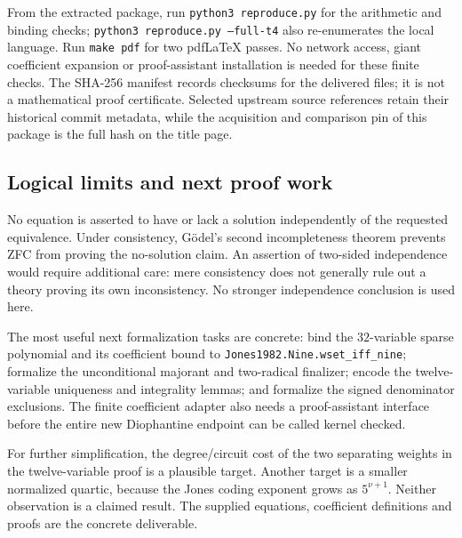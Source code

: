\documentclass[11pt,a4paper]{article}
\theoremstyle{remark}
\begin{document}
From the extracted package, run \texttt{python3 reproduce.py} for the
arithmetic and binding checks; \texttt{python3 reproduce.py --full-t4}
also re-enumerates the local language.  Run \texttt{make pdf} for two
pdfLaTeX passes.  No network access, giant coefficient expansion or
proof-assistant installation is needed for these finite checks.
The SHA-256 manifest records checksums for the delivered files; it is not a
mathematical proof certificate.  Selected upstream source references
retain their historical commit metadata, while the acquisition and
comparison pin of this package is the full hash on the title page.

\subsection{Logical limits and next proof work}

No equation is asserted to have or lack a solution independently of
the requested equivalence.  Under consistency, G\"odel's second
incompleteness theorem prevents ZFC from proving the no-solution claim.
An assertion of two-sided independence would require additional care:
mere consistency does not generally rule out a theory proving its own
inconsistency.  No stronger independence conclusion is used here.

The most useful next formalization tasks are concrete: bind the
$32$-variable sparse polynomial and its coefficient bound to
\texttt{Jones1982.Nine.wset\_iff\_nine}; formalize the unconditional
majorant and two-radical finalizer; encode the twelve-variable uniqueness
and integrality lemmas; and formalize the signed denominator exclusions.
The finite coefficient adapter also needs a proof-assistant interface
before the entire new Diophantine endpoint can be called kernel checked.

For further simplification, the degree/circuit cost of the two separating
weights in the twelve-variable proof is a plausible target.  Another
target is a smaller normalized quartic, because the Jones coding exponent
grows as $5^{\nu+1}$.  Neither observation is a claimed result.  The
supplied equations, coefficient definitions and proofs are the concrete
deliverable.
\end{document}
